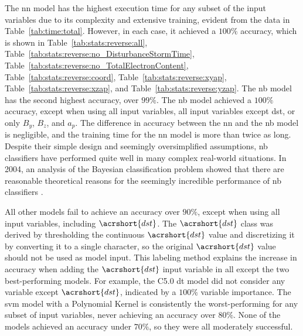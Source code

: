 \documentclass[sn-mathphys-num]{sn-jnl}%
\begin{document}
The \acrfull{nn} model has the highest execution time for any subset of the input variables due to its complexity and extensive training, evident from the data in Table~\ref{tab:time:total}. However, in each case, it achieved a $100\%$ accuracy, which is shown in Table~\ref{tab:stats:reverse:all}, Table~\ref{tab:stats:reverse:no_DisturbanceStormTime}, Table~\ref{tab:stats:reverse:no_TotalElectronContent}, Table~\ref{tab:stats:reverse:coord}, Table~\ref{tab:stats:reverse:xyap}, Table~\ref{tab:stats:reverse:xzap}, and Table~\ref{tab:stats:reverse:yzap}. The \acrfull{nb} model has the second highest accuracy, over $99\%$. The \acrshort{nb} model achieved a $100\%$ accuracy, except when using all input variables, all input variables except \acrfull{dst}, or only $B_{y}$, $B_{z}$, and $a_{p}$. The difference in accuracy between the \acrshort{nn} and the \acrshort{nb} model is negligible, and the training time for the \acrshort{nn} model is more than twice as long. Despite their simple design and seemingly oversimplified assumptions, \acrshort{nb} classifiers have performed quite well in many complex real-world situations. In 2004, an analysis of the Bayesian classification problem showed that there are reasonable theoretical reasons for the seemingly incredible performance of \acrshort{nb} classifiers \cite{Zhang2004}.

All other models fail to achieve an accuracy over $90\%$, except when using all input variables, including $\acrshort{dst}$. The $\acrshort{dst}$ class was derived by thresholding the continuous $\acrshort{dst}$ value and discretizing it by converting it to a single character, so the original $\acrshort{dst}$ value should not be used as model input. This labeling method explains the increase in accuracy when adding the $\acrshort{dst}$ input variable in all except the two best-performing models. For example, the C5.0 \acrshort{dt} model did not consider any variable except $\acrshort{dst}$, indicated by a $100\%$ variable importance. The \acrfull{svm} model with a Polynomial Kernel is consistently the worst-performing for any subset of input variables, never achieving an accuracy over $80\%$. None of the models achieved an accuracy under $70\%$, so they were all moderately successful.
\end{document}
